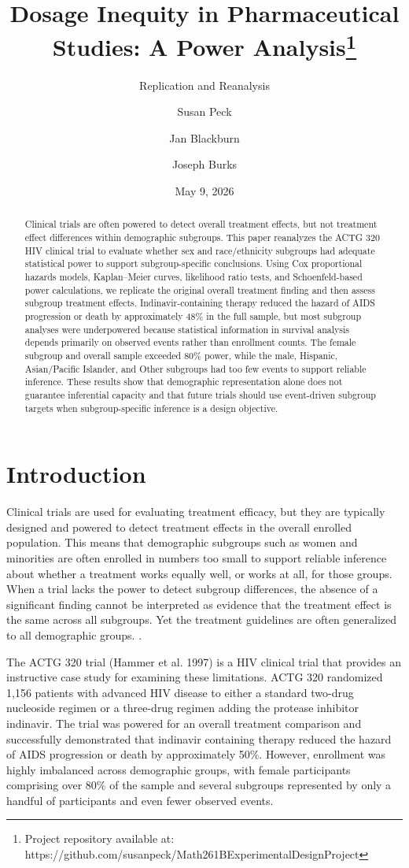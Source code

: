 \documentclass[
  letterpaper,
  DIV=11,
  numbers=noendperiod]{scrartcl}
\title{Dosage Inequity in Pharmaceutical Studies: A Power
Analysis\thanks{Project repository available at:
https://github.com/susanpeck/Math261BExperimentalDesignProject}}
\subtitle{Replication and Reanalysis}
\author{Susan Peck \and Jan Blackburn \and Joseph Burks}
\date{May 9, 2026}
\begin{document}
\maketitle
\begin{abstract}
Clinical trials are often powered to detect overall treatment effects,
but not treatment effect differences within demographic subgroups. This
paper reanalyzes the ACTG 320 HIV clinical trial to evaluate whether sex
and race/ethnicity subgroups had adequate statistical power to support
subgroup-specific conclusions. Using Cox proportional hazards models,
Kaplan--Meier curves, likelihood ratio tests, and Schoenfeld-based power
calculations, we replicate the original overall treatment finding and
then assess subgroup treatment effects. Indinavir-containing therapy
reduced the hazard of AIDS progression or death by approximately 48\% in
the full sample, but most subgroup analyses were underpowered because
statistical information in survival analysis depends primarily on
observed events rather than enrollment counts. The female subgroup and
overall sample exceeded 80\% power, while the male, Hispanic,
Asian/Pacific Islander, and Other subgroups had too few events to
support reliable inference. These results show that demographic
representation alone does not guarantee inferential capacity and that
future trials should use event-driven subgroup targets when
subgroup-specific inference is a design objective.
\end{abstract}


\section{Introduction}\label{introduction}

Clinical trials are used for evaluating treatment efficacy, but they are
typically designed and powered to detect treatment effects in the
overall enrolled population. This means that demographic subgroups such
as women and\\
minorities are often enrolled in numbers too small to support reliable
inference about whether a treatment works equally well, or works at all,
for those groups. When a trial lacks the power to detect subgroup
differences, the absence of a significant finding cannot be interpreted
as evidence that the treatment effect is the same across all subgroups.
Yet the treatment guidelines are often generalized to all demographic
groups. .

The ACTG 320 trial (Hammer et al. 1997) is a HIV clinical trial that
provides an instructive case study for examining these limitations. ACTG
320 randomized 1,156 patients with advanced HIV disease to either a
standard two-drug nucleoside regimen or a three-drug regimen adding the
protease inhibitor indinavir. The trial was powered for an overall
treatment comparison and successfully demonstrated that indinavir
containing therapy reduced the hazard of AIDS progression or death by
approximately 50\%. However, enrollment was highly imbalanced across
demographic groups, with female participants comprising over 80\% of the
sample and several subgroups represented by only a handful of
participants and even fewer observed events.
\end{document}
